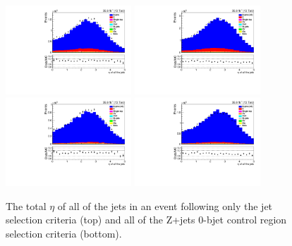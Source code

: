 \begin{figure}[ht]
\centering
\includegraphics[width=0.42\textwidth]{figs/background-estimation/plots/unblinded/DY_control_old_prompt_ee_ttbarInc/totalJetEta_SingleTop_jetSel_ee.pdf}
\includegraphics[width=0.42\textwidth]{figs/background-estimation/plots/unblinded/DY_control_old_prompt_mumu_ttbarInc/totalJetEta_SingleTop_jetSel_mumu.pdf}
\\
\includegraphics[width=0.42\textwidth]{figs/background-estimation/plots/unblinded/DY_control_old_prompt_ee_ttbarInc/totalJetEta_SingleTop_wMass_ee.pdf}
\includegraphics[width=0.42\textwidth]{figs/background-estimation/plots/unblinded/DY_control_old_prompt_mumu_ttbarInc/totalJetEta_SingleTop_wMass_mumu.pdf}
\caption{
The total $\eta$ of all of the jets in an event following only the jet selection criteria (top) and all of the Z+jets 0-bjet control region selection criteria (bottom).
}
\label{fig:App_CR_LO_totalJetEta}
\end{figure}

